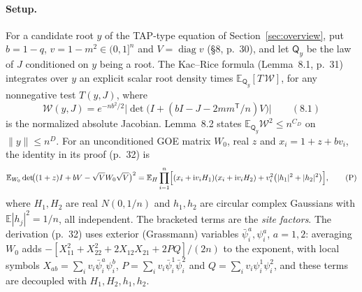 \documentclass[11pt]{article}
\newcommand{\E}{\mathbb{E}}
\newcommand{\norm}[1]{\lVert #1\rVert}
\newcommand{\ploc}[2]{#1}
\begin{document}
\paragraph{Setup.}
For a candidate root $y$ of the TAP-type equation of Section~\ref{sec:overview}, put $b=1-q$,
$v=1-m^2\in(0,1]^n$ and $V=\operatorname{diag}v$
\ploc{(\S8, p.~30)}{profile-roots.tex:28--31}, and let $\mathsf Q_y$ be the
law of $J$ conditioned on $y$ being a root. The Kac--Rice formula
\ploc{(Lemma~8.1, p.~31)}{profile-roots.tex:46--65} integrates over $y$ an
explicit scalar root density times $\E_{\mathsf Q_y}[T\,\mathcal W]$, for any
nonnegative test $T(y,J)$, where
\[
 \mathcal W(y,J)=e^{-nb^2/2}\bigl|\det\bigl(I+(bI-J-2mm^{\mathsf T}/n)V\bigr)\bigr|
 \qquad\ploc{(8.1)}{profile-roots.tex:59--61}
\]
is the normalized absolute Jacobian. Lemma~8.2 states
$\E_{\mathsf Q_y}\mathcal W^2\le n^{C_D}$ on $\norm y\le n^D$. For an
unconditioned GOE matrix $W_0$, real $z$ and $x_i=1+z+bv_i$, the identity in
its proof \ploc{(p.~32)}{profile-roots.tex:152--162} is
\begin{equation*}
 \E_{W_0}\det\!\bigl((1+z)I+bV-\sqrt V W_0\sqrt V\bigr)^2
 =\E_H\prod_{i=1}^n\Bigl[(x_i+\mathrm i v_iH_1)(x_i+\mathrm i v_iH_2)
 +v_i^2\bigl(|h_1|^2+|h_2|^2\bigr)\Bigr],
 \tag{P}
\end{equation*}
where $H_1,H_2$ are real $N(0,1/n)$ and $h_1,h_2$ are circular complex
Gaussians with $\E|h_j|^2=1/n$, all independent. The bracketed terms are the
\emph{site factors}. The derivation \ploc{(p.~32)}{profile-roots.tex:162--170}
uses exterior (Grassmann) variables $\bar\psi_i^a,\psi_i^a$, $a=1,2$: averaging
$W_0$ adds $-[X_{11}^2+X_{22}^2+2X_{12}X_{21}+2PQ]/(2n)$ to the exponent, with
local symbols $X_{ab}=\sum_iv_i\bar\psi_i^a\psi_i^b$,
$P=\sum_iv_i\bar\psi_i^1\bar\psi_i^2$ and $Q=\sum_iv_i\psi_i^1\psi_i^2$, and
these terms are decoupled with $H_1,H_2,h_1,h_2$.
\end{document}
